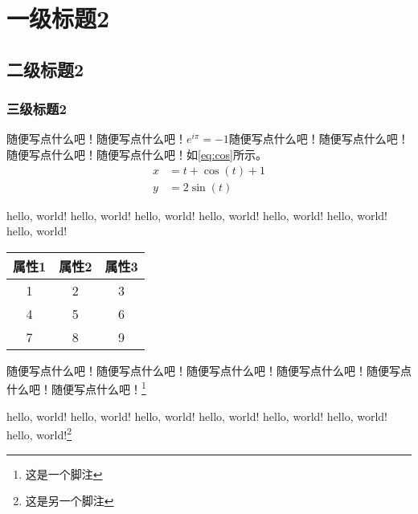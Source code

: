 \chapter{一级标题2}
\section{二级标题2}
\subsection{三级标题2}
随便写点什么吧！随便写点什么吧！$e^{i\pi}=-1$随便写点什么吧！随便写点什么吧！随便写点什么吧！随便写点什么吧！如\ref{eq:cos}所示。
\begin{align}
    x &=t+\cos(t)  + 1 \label{eq:cos}  \\
    y &=2\sin(t)
\end{align}


hello, world! hello, world! hello, world! hello, world! hello, world! hello, world! hello, world!

\begin{table}[h]

\begin{center}
    \begin{tabular}{ccc} 
    \toprule
    \textbf{属性1} & \textbf{属性2} & \textbf{属性3} \\ \midrule
    1            & 2            & 3            \\
    4            & 5            & 6            \\
    7            & 8            & 9            \\ \bottomrule
    \end{tabular}
\end{center}

\end{table}

随便写点什么吧！随便写点什么吧！随便写点什么吧！随便写点什么吧！随便写点什么吧！随便写点什么吧！\footnote{这是一个脚注}

hello, world! hello, world! hello, world! hello, world! hello, world! hello, world! hello, world!\footnote{这是另一个脚注}